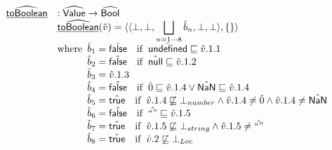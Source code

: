 \[
\begin{array}{ll}

\ahf{toBoolean} & : \aValue \rightarrow \abs{Bool} \\
& \ahf{toBoolean}(\hat{v})
  = \langle\langle \bot,\bot,\displaystyle\bigsqcup_{n=1\cdots8}\hat{b}_n,\bot,\bot\rangle,\{\}\rangle \\
& \wherec{
  \hat{b}_1 = \afalse \quad\ifc{\aundef\sqsubseteq\hat{v}.1.1}\\
  \hat{b}_2 = \afalse \quad\ifc{\anull\sqsubseteq\hat{v}.1.2}\\
  \hat{b}_3 = \hat{v}.1.3 \\
  \hat{b}_4 = \afalse \quad\ifc{\hat{0}\sqsubseteq\hat{v}.1.4\lor\hat{\SF{NaN}}\sqsubseteq\hat{v}.1.4} \\
  \hat{b}_5 = \atrue \quad\ifc{\hat{v}.1.4\not\sqsubseteq\bot_{number}\land\hat{v}.1.4\neq\hat{0}\land\hat{v}.1.4\neq\hat{\SF{NaN}}} \\
  \hat{b}_6 = \afalse \quad\ifc{\hat{``"}\sqsubseteq\hat{v}.1.5} \\
  \hat{b}_7 = \atrue \quad\ifc{\hat{v}.1.5\not\sqsubseteq\bot_{string}\land\hat{v}.1.5\neq\hat{``"}}\\
  \hat{b}_8 = \atrue \quad\ifc{\hat{v}.2\not\sqsubseteq\bot_{Loc}}\\
}\\
\\


\end{array}\]
